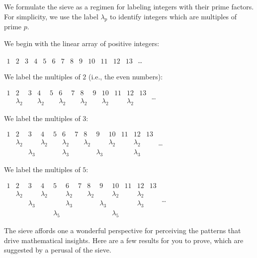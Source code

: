 \begin{enumerate}
\begin{enumerate}
\medskip

We formulate the sieve as a regimen for labeling integers with their prime factors.  For simplicity, we use the label $\lambda_p$ to identify integers which are multiples of prime $p$.

\medskip

We begin with the linear array of positive integers:

$\begin{array}{c|c|c|c|c|c|c|c|c|c|c|c|c}
1 & 2 & 3 & 4 & 5 & 6 & 7 & 8 & 9 & 10 & 11 & 12 & 13
\end{array}$ \ldots

\medskip

We label the multiples of $2$ (i.e., the even numbers):

$\begin{array}{c|c|c|c|c|c|c|c|c|c|c|c|c}
1 & 2 & 3 & 4 & 5 & 6 & 7 & 8 & 9 & 10 & 11 & 12 & 13 \\
 & \lambda_2 & & \lambda_2 & & \lambda_2 & & \lambda_2 & & \lambda_2 & & \lambda_2 &
\end{array}$ \ldots

\medskip

We label the multiples of $3$:

$\begin{array}{c|c|c|c|c|c|c|c|c|c|c|c|c}
1 & 2 & 3 & 4 & 5 & 6 & 7 & 8 & 9 & 10 & 11 & 12 & 13 \\
 & \lambda_2 & & \lambda_2 & & \lambda_2 & & \lambda_2 & & \lambda_2 & & \lambda_2 & \\
 & & \lambda_3 & &  & \lambda_3 & & & \lambda_3 & & & \lambda_3 &
\end{array}$ \ldots

\medskip

We label the multiples of $5$:

$\begin{array}{c|c|c|c|c|c|c|c|c|c|c|c|c}
1 & 2 & 3 & 4 & 5 & 6 & 7 & 8 & 9 & 10 & 11 & 12 & 13 \\
 & \lambda_2 & & \lambda_2 & & \lambda_2 & & \lambda_2 & & \lambda_2 & & \lambda_2 & \\
 & & \lambda_3 & &  & \lambda_3 & & & \lambda_3 & & & \lambda_3 & \\
 & & & & \lambda_5 & & & & & \lambda_5 & & & 
\end{array}$ \ldots

\bigskip

The sieve affords one a wonderful perspective for perceiving the patterns that drive mathematical insights.  Here are a few results for you to prove, which are suggested by a perusal of the sieve.


\end{enumerate}
\end{enumerate}
